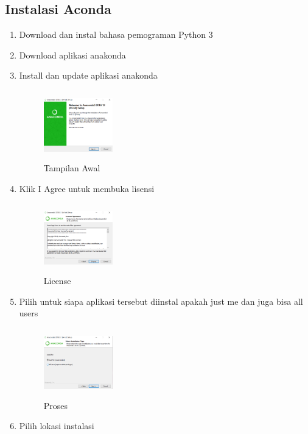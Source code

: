\subsection{Instalasi Aconda}
\begin{enumerate}
\item Download dan instal bahasa pemograman Python 3
\item Download aplikasi anakonda
\item Install dan update aplikasi anakonda
 \begin{figure}[!htbp]
        \centering
        \includegraphics[width=3cm,height=3cm]{figures/tomyprawoto/111.png}
        \caption{Tampilan Awal}
        \label{awal}
        \end{figure}
    \item Klik I Agree untuk membuka lisensi
     \begin{figure}[!htbp]
        \centering
        \includegraphics[width=3cm,height=3cm]{figures/tomyprawoto/222.png}
        \caption{License}
        \label{awal}
        \end{figure}
    \item  Pilih untuk siapa aplikasi tersebut diinstal apakah just me dan juga bisa all users
     \begin{figure}[!htbp]
        \centering
        \includegraphics[width=3cm,height=3cm]{figures/tomyprawoto/333.png}
        \caption{Proses}
        \label{awal}
        \end{figure}
    \item  Pilih lokasi instalasi

\end{enumerate}
